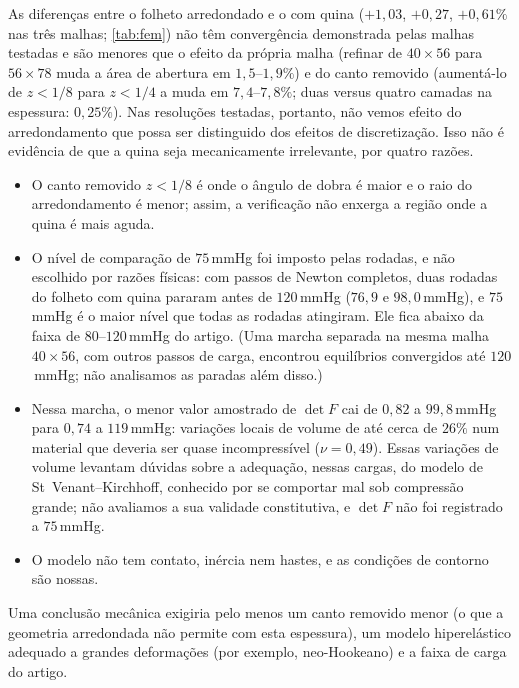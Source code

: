 \documentclass[11pt,a4paper]{article}
\theoremstyle{plain}
\theoremstyle{remark}
\begin{document}
As diferenças entre o folheto arredondado e o com quina ($+1{,}03$, $+0{,}27$, $+0{,}61\%$ nas três malhas; \cref{tab:fem})
não têm convergência demonstrada pelas malhas testadas e são menores que o efeito da própria malha (refinar de $40\times56$
para $56\times78$ muda a área de abertura em $1{,}5$--$1{,}9\%$) e do canto removido (aumentá-lo de $z<1/8$ para $z<1/4$ a muda
em $7{,}4$--$7{,}8\%$; duas versus quatro camadas na espessura: $0{,}25\%$). Nas resoluções testadas, portanto, não vemos efeito
do arredondamento que possa ser distinguido dos efeitos de discretização. Isso não é evidência de que a quina seja
mecanicamente irrelevante, por quatro razões.
\begin{itemize}
\item O canto removido $z<1/8$ é onde o ângulo de dobra é maior e o raio do arredondamento é menor; assim, a verificação não
  enxerga a região onde a quina é mais aguda.
\item O nível de comparação de $75$\,mmHg foi imposto pelas rodadas, e não escolhido por razões físicas: com passos de Newton
  completos, duas rodadas do folheto com quina pararam antes de $120$\,mmHg ($76{,}9$ e $98{,}0$\,mmHg), e $75$\,mmHg é o
  maior nível que todas as rodadas atingiram. Ele fica abaixo da faixa de $80$--$120$\,mmHg do artigo. (Uma marcha separada
  na mesma malha $40\times56$, com outros passos de carga, encontrou equilíbrios convergidos até $120$\,mmHg; não analisamos
  as paradas além disso.)
\item Nessa marcha, o menor valor amostrado de $\det F$ cai de $0{,}82$ a $99{,}8$\,mmHg para $0{,}74$ a $119$\,mmHg: variações
  locais de volume de até cerca de $26\%$ num material que deveria ser quase incompressível ($\nu=0{,}49$). Essas variações de
  volume levantam dúvidas sobre a adequação, nessas cargas, do modelo de St~Venant--Kirchhoff, conhecido por se comportar mal
  sob compressão grande; não avaliamos a sua validade constitutiva, e $\det F$ não foi registrado a $75$\,mmHg.
\item O modelo não tem contato, inércia nem hastes, e as condições de contorno são nossas.
\end{itemize}
Uma conclusão mecânica exigiria pelo menos um canto removido menor (o que a geometria arredondada não permite com esta
espessura), um modelo hiperelástico adequado a grandes deformações (por exemplo, neo-Hookeano) e a faixa de carga do artigo.

\end{document}
